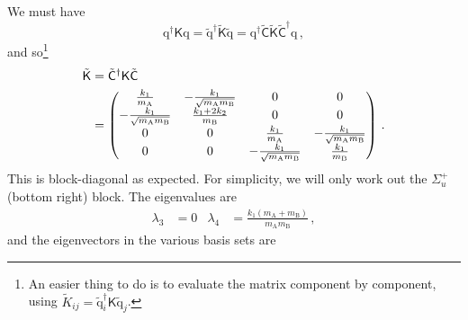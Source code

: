 \documentclass{article}
\theoremstyle{plain}\theoremheaderfont{\normalfont\itshape}\theorembodyfont{\rmfamily}\theoremseparator{.}\newtheorem*{rem}{Remark}\newtheorem*{ex}{Example}\newtheorem*{proof}{Proof}\newtheorem*{altp}{Alternative proof}
\theoremstyle{plain}\theoremheaderfont{\normalfont\bfseries}\theorembodyfont{\rmfamily}\theoremseparator{.}\newtheorem{thm}{Theorem}[section]\newtheorem{lem}[thm]{Lemma}\newtheorem{prop}[thm]{Proposition}\newtheorem*{cor}{Corollary}\newtheorem{defn}[thm]{Definition}\newtheorem{clm}[thm]{Claim}\newtheorem{clminproof}{Claim}
\theoremstyle{break}\theoremheaderfont{\normalfont\itshape}\theorembodyfont{\rmfamily}\theoremseparator{.\medskip}\newtheorem*{proofskip}{Proof}\newtheorem*{exs}{Examples}\newtheorem*{rems}{Remarks}
\theoremstyle{break}\theoremheaderfont{\normalfont\bfseries}\theorembodyfont{\rmfamily}\theoremseparator{.\medskip}\newtheorem{lemskip}[thm]{Lemma}\newtheorem{defnskip}[thm]{Definition}\newtheorem{propskip}[thm]{Proposition}\newtheorem{thmskip}[thm]{Theorem}
\numberwithin{equation}{section}
\newcommand{\vb}[1]{\bm{\mathrm{#1}}}
\renewcommand{\AA}{\mathrm{A}}
\newcommand{\BB}{\mathrm{B}}
\begin{document}
    We must have
    \begin{equation}
        \vb{q}^\dagger\mathsf{K}\vb{q}=\tilde{\vb{q}}^\dagger\tilde{\mathsf{K}}\tilde{\vb{q}}=\vb{q}^\dagger\tilde{\mathsf{C}}\tilde{\mathsf{K}}\tilde{\mathsf{C}}^\dagger\vb{q}\,,
    \end{equation}
    and so\footnote{An easier thing to do is to evaluate the matrix component by component, using \(\tilde{K}_{ij}=\tilde{\vb{q}}_i^\dagger \mathsf{K}\tilde{\vb{q}}_j\).}
    \begin{align}
        \tilde{\mathsf{K}}&=\tilde{\mathsf{C}}^\dagger\mathsf{K}\tilde{\mathsf{C}}\notag\\
        &=\begin{pmatrix}
            \frac{k_1}{m_{\AA}} & -\frac{k_1}{\sqrt{m_{\AA}m_{\BB}}} & 0 & 0 \\
            -\frac{k_1}{\sqrt{m_{\AA}m_{\BB}}} & \frac{k_1+2k_2}{m_{\BB}} & 0 & 0 \\
            0 & 0 & \frac{k_1}{m_{\AA}} & -\frac{k_1}{\sqrt{m_{\AA}m_{\BB}}} \\
            0 & 0 & -\frac{k_1}{\sqrt{m_{\AA}m_{\BB}}} & \frac{k_1}{m_{\BB}}
        \end{pmatrix}\,.
    \end{align}
    This is block-diagonal as expected. For simplicity, we will only work out the \(\Sigma_u^+\) (bottom right) block. The eigenvalues are
    \begin{align}
        \lambda_3&=0 & \lambda_4&=\frac{k_1(m_{\AA}+m_{\BB})}{m_{\AA}m_{\BB}}\,,
    \end{align}
    and the eigenvectors in the various basis sets are
\end{document}
